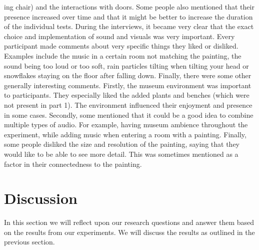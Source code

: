 \documentclass[a4paper]{article}
\begin{document}
ing chair) and the interactions with doors. Some people also mentioned that their presence increased over time and that it might be better to increase the duration of the individual tests. During the interviews, it became very clear that the exact choice and implementation of sound and visuals was very important. Every participant made comments about very specific things they liked or disliked. Examples include the music in a certain room not matching the painting, the sound being too loud or too soft, rain particles tilting when tilting your head or snowflakes staying on the floor after falling down. Finally, there were some other generally interesting comments. Firstly, the museum environment was important to participants. They especially liked the added plants and benches (which were not present in part 1). The environment influenced their enjoyment and presence in some cases. Secondly, some mentioned that it could be a good idea to combine multiple types of audio. For example, having museum ambience throughout the experiment, while adding music when entering a room with a painting. Finally, some people disliked the size and resolution of the painting, saying that they would like to be able to see more detail. This was sometimes mentioned as a factor in their connectedness to the painting.

\section{Discussion}

In this section we will reflect upon our research questions and answer them based on the results from our experiments. We will discuss the results as outlined in the previous section.
\end{document}
